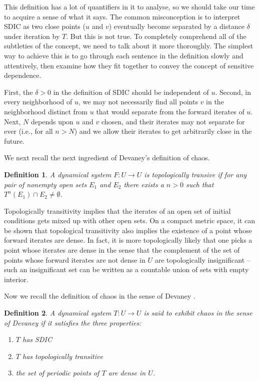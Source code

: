 \documentclass[12 pt]{article}
\newtheorem{Definition}{Definition}[]
\begin{document}
This definition has a lot of quantifiers in it to analyse, so we should take our time to acquire a sense of what it says. The common misconception is to interpret SDIC as two close points ($u$ and $v$) eventually become separated by a distance $\delta$ under iteration by $T$. But this is not true. To completely comprehend all of the subtleties of the concept, we need to talk about it more thoroughly. The simplest way to achieve this is to go through each sentence in the definition slowly and attentively, then examine how they fit together to convey the concept of sensitive dependence.

First, the $\delta>0$ in the definition of SDIC should be independent of $u$. Second, in every neighborhood of $u$, we may not necessarily find all points $v$ in the neighborhood distinct from $u$ that would separate from the forward iterates of $u$. Next, $N$ depends upon $u$ and $v$ chosen, and their iterates may not separate for ever (i.e., for all $n>N$) and we allow their iterates to get arbitrarily close in the future. 

 

We next recall the next ingredient of Devaney's definition of chaos.  

\begin{Definition}
	A dynamical system $F: U \to U$ is topologically transive if for any pair of nonempty open sets $E_1$ and $E_2$ there exists a $n>0$ such that $T^n(E_1) \cap E_2 \not= \emptyset$. 
\end{Definition}

Topologically transitivity implies that the iterates of an open set of initial conditions gets mixed up with other open sets. On a compact metric space, it can be shown that topological transitivity also implies the existence of a point whose forward iterates are dense. In fact, it is more topologically likely that one picks a point whose iterates are dense in the sense that the complement of the set of points whose forward iterates are not dense in $U$  are topologically insignificant -- such an insignificant set can be written as a countable union of sets with empty interior. 

Now we recall the definition of chaos in the sense of Devaney \cite{devaney2018introduction}.
\begin{Definition}
	A dynamical system $T: U \to U$ is said to exhibit chaos in the sense of Devaney if it satisfies the three properties:
	\begin{enumerate}
		\item $T$ has SDIC
		\item $T$ has topologically transitive
		\item the set of periodic points of $T$ are dense in $U$. 
	\end{enumerate}
\end{Definition}
\end{document}
